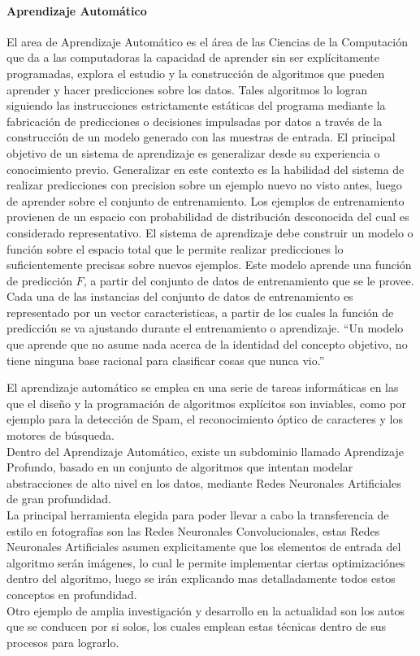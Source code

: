 \documentclass[a4paper,11pt,spanish]{book}
\begin{document}
    \paragraph{Aprendizaje Automático}
      El area de Aprendizaje Automático es el área de las Ciencias de la Computación que da a las computadoras la capacidad de aprender sin ser explícitamente programadas, explora el estudio
      y la construcción de algoritmos que pueden aprender y hacer predicciones sobre los datos. Tales algoritmos lo logran siguiendo las instrucciones estrictamente estáticas del programa
      mediante la fabricación de predicciones o decisiones impulsadas por datos​ a través de la construcción de un modelo generado con las muestras de entrada.
      El principal objetivo de un sistema de aprendizaje es generalizar desde su experiencia o conocimiento previo. Generalizar en este contexto es la habilidad del sistema de realizar
      predicciones con precision sobre un ejemplo nuevo no visto antes, luego de aprender sobre el conjunto de entrenamiento. Los ejemplos de entrenamiento provienen de un espacio
      con probabilidad de distribución desconocida del cual es considerado representativo. El sistema de aprendizaje debe construir un modelo o función sobre el espacio total que le permite realizar
      predicciones lo suficientemente precisas sobre nuevos ejemplos. Este modelo aprende una función de predicción $F$, a partir del conjunto de datos de entrenamiento que se le provee.
      Cada una de las instancias del conjunto de datos de entrenamiento es representado por un vector caracteristicas, a partir de los cuales la función de predicción
      se va ajustando durante el entrenamiento o aprendizaje.
      “Un modelo que aprende que no asume nada acerca de la identidad del concepto objetivo, no tiene ninguna base racional para clasificar cosas que nunca vio.” \cite{Mitchell:1997:ML:541177}

      El aprendizaje automático se emplea en una serie de tareas informáticas en las que el diseño y la programación de algoritmos explícitos son inviables, como por ejemplo para la detección de Spam, el reconocimiento
      óptico de caracteres y los motores de búsqueda.\\
      Dentro del Aprendizaje Automático, existe un subdominio llamado Aprendizaje Profundo, basado en un conjunto de algoritmos que intentan modelar abstracciones de alto nivel en los datos,
      mediante Redes Neuronales Artificiales de gran profundidad.\\
      La principal herramienta elegida para poder llevar a cabo la transferencia de estilo en fotografías son las Redes Neuronales Convolucionales, estas Redes Neuronales Artificiales asumen
      explicitamente que los elementos de  entrada del algoritmo serán imágenes, lo cual le permite implementar ciertas optimizaciónes dentro del algoritmo, luego
      se irán explicando mas detalladamente todos estos conceptos en profundidad.\\
      Otro ejemplo de amplia investigación y desarrollo en la actualidad son los autos que se conducen por si solos, los cuales emplean estas técnicas dentro de sus procesos para lograrlo.\\
\end{document}
